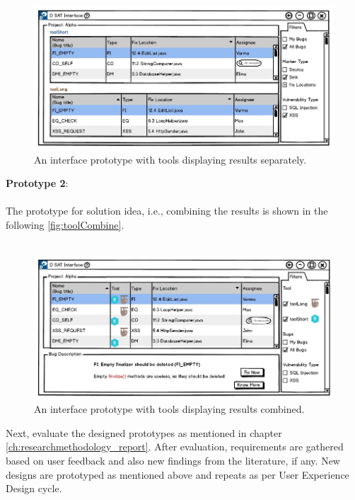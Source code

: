 \begin{figure}[hbt!]
	\centering
	\includegraphics[width=\linewidth]{figures/d_seperate}
	\caption{An interface prototype with tools displaying results separately.}
	\label{fig:toolSeperate}
\end{figure}

\clearpage

\textbf{Prototype 2}: \\ \\

The prototype for solution idea, i.e., combining the results is shown in the following \autoref{fig:toolCombine}. \\ \\

\begin{figure}[hbt!]
	\centering
	\includegraphics[width=\linewidth]{figures/d_combine}
	\caption{An interface prototype with tools displaying results combined.}
	\label{fig:toolCombine}
\end{figure}

Next, evaluate the designed prototypes as mentioned in chapter \ref{ch:researchmethodology_report}. After evaluation, requirements are gathered based on user feedback and also new findings from the literature, if any. New designs are prototyped as mentioned above and repeats as per User Experience Design cycle. \\ \\

